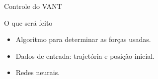 \begin{frame}{Controle do VANT}

\begin{block}{O que será feito}
    \begin{itemize}
        \item Algoritmo para determinar as forças usadas.
        \item Dados de entrada: trajetória e posição inicial.
        \item Redes neurais.
    \end{itemize} 
\end{block}
\begin{figure}
\centering

\end{figure}
\end{frame}